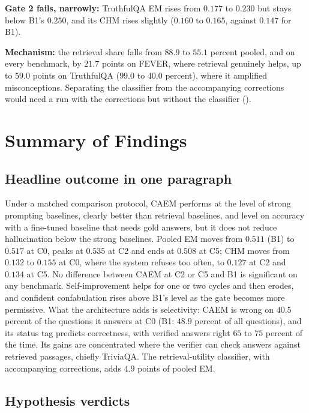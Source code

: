 \textbf{Gate 2 fails, narrowly:} TruthfulQA EM rises from $0.177$ to $0.230$ but stays below B1's $0.250$, and its CHM rises slightly ($0.160$ to $0.165$, against $0.147$ for B1).

\textbf{Mechanism:} the retrieval share falls from $88.9$ to $55.1$ percent pooled, and on every benchmark, by $21.7$ points on FEVER, where retrieval genuinely helps, up to $59.0$ points on TruthfulQA ($99.0$ to $40.0$ percent), where it amplified misconceptions. Separating the classifier from the accompanying corrections would need a run with the corrections but without the classifier ().

\section{Summary of Findings}
\label{sec:summary-findings}

\subsection{Headline outcome in one paragraph}
\label{sec:summary-headline}

Under a matched comparison protocol, CAEM performs at the level of strong prompting baselines, clearly better than retrieval baselines, and level on accuracy with a fine-tuned baseline that needs gold answers, but it does not reduce hallucination below the strong baselines. Pooled EM moves from $0.511$ (B1) to $0.517$ at C0, peaks at $0.535$ at C2 and ends at $0.508$ at C5; CHM moves from $0.132$ to $0.155$ at C0, where the system refuses too often, to $0.127$ at C2 and $0.134$ at C5. No difference between CAEM at C2 or C5 and B1 is significant on any benchmark. Self-improvement helps for one or two cycles and then erodes, and confident confabulation rises above B1's level as the gate becomes more permissive. What the architecture adds is selectivity: CAEM is wrong on $40.5$ percent of the questions it answers at C0 (B1: $48.9$ percent of all questions), and its status tag predicts correctness, with verified answers right $65$ to $75$ percent of the time. Its gains are concentrated where the verifier can check answers against retrieved passages, chiefly TriviaQA. The retrieval-utility classifier, with accompanying corrections, adds $4.9$ points of pooled EM.

\subsection{Hypothesis verdicts}
\label{sec:summary-hypotheses}

